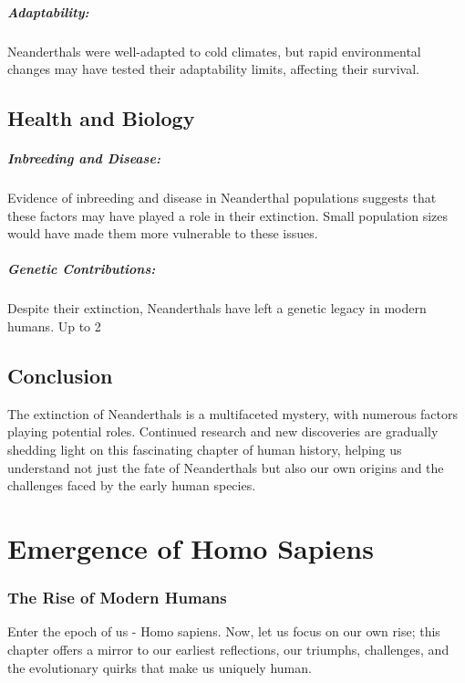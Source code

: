 \documentclass[a4paper,12pt]{book}
\begin{document}
\paragraph{Adaptability:}
Neanderthals were well-adapted to cold climates, but rapid environmental changes may have tested their adaptability limits, affecting their survival.

\section*{Health and Biology}

\paragraph{Inbreeding and Disease:}
Evidence of inbreeding and disease in Neanderthal populations suggests that these factors may have played a role in their extinction. Small population sizes would have made them more vulnerable to these issues.

\paragraph{Genetic Contributions:}
Despite their extinction, Neanderthals have left a genetic legacy in modern humans. Up to 2%

\section*{Conclusion}

The extinction of Neanderthals is a multifaceted mystery, with numerous factors playing potential roles. Continued research and new discoveries are gradually shedding light on this fascinating chapter of human history, helping us understand not just the fate of Neanderthals but also our own origins and the challenges faced by the early human species.

\chapter{Emergence of Homo Sapiens}
\subsection*{The Rise of Modern Humans}
Enter the epoch of us - Homo sapiens. Now, let us focus on our own rise; this chapter offers a mirror to our earliest reflections, our triumphs, challenges, and the evolutionary quirks that make us uniquely human.
\end{document}
